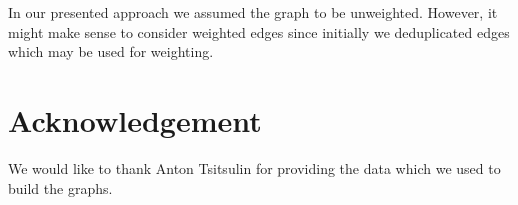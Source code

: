 \documentclass[sigconf]{acmart}
\begin{document}
In our presented approach we assumed the graph to be unweighted.
However, it might make sense to consider weighted edges since initially we deduplicated edges which may be used for weighting.

\section*{Acknowledgement}
We would like to thank Anton Tsitsulin for providing the data which we used to build the graphs.


  
\end{document}
